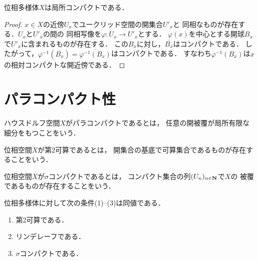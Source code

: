 \begin{EG}
    位相多様体\(X\)は局所コンパクトである．
\end{EG}
\begin{proof}
    \(x\in X\)の近傍\(U_x\)でユークリッド空間の開集合\(U'_x\)と
    同相なものが存在する．\(U_x\)と\(U'_x\)の間の
    同相写像を\(\varphi\colon U_x\to U'_x\)とする．
    \(\varphi(x)\)を中心とする開球\(B_x\)で\(U'_x\)に含まれるものが存在する．
    この\(B_x\)に対し，\(\overline{B_x}\)はコンパクトである．
    したがって，\(\varphi^{-1}\left(\overline{B_x}\right)
    =\overline{\varphi^{-1}(B_x)}\)はコンパクトである．
    すなわち\(\varphi^{-1}(B_x)\)は\(x\)の相対コンパクトな開近傍である．
\end{proof}






















\section{パラコンパクト性}

\begin{DFN}[パラコンパクト]
    ハウスドルフ空間\(X\)がパラコンパクトであるとは，
    任意の開被覆が局所有限な細分をもつことをいう．
\end{DFN}

\begin{DFN}[第2可算]
    位相空間\(X\)が第2可算であるとは，
    開集合の基底で可算集合であるものが存在することをいう．
\end{DFN}

\begin{DFN}
    位相空間\(X\)が\(\sigma\)コンパクトであるとは，
    コンパクト集合の列\((U_n)_{n\in\mathbf{N}}\)で\(X\)の
    被覆であるものが存在することをいう．
\end{DFN}

\begin{PRP}
    位相多様体に対して次の条件(1)--(3)は同値である．
    \begin{enumerate}[(1)]
        \item 第2可算である．
        \item リンデレーフである．
        \item \(\sigma\)コンパクトである．
    \end{enumerate}
\end{PRP}




























